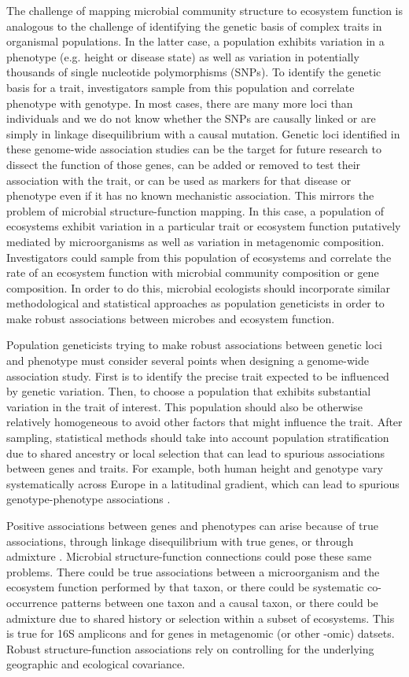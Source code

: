 \documentclass{article}
\begin{document}
The challenge of mapping microbial community structure to ecosystem function is
analogous to the challenge of identifying the genetic basis of complex traits in
organismal populations. In the latter case, a population exhibits variation in a
phenotype (e.g. height or disease state) as well as variation in potentially
thousands of single nucleotide polymorphisms
(SNPs). To identify the genetic basis for a trait, investigators sample from
this population and correlate phenotype with genotype. In most cases, there are
many more loci than individuals and we do not know whether the SNPs are causally
linked or are simply in linkage disequilibrium with a causal mutation. 
Genetic loci identified in these genome-wide association
studies can be the target for future research to dissect the function of those
genes, can be added or removed to test their association with the trait, or can
be used as markers for that disease or phenotype even if it has no known
mechanistic association. This mirrors the problem of microbial
structure-function mapping. In this case, a population of ecosystems exhibit
variation in a particular trait or ecosystem function putatively mediated by
microorganisms as well as variation in metagenomic composition. Investigators
could sample from this population of ecosystems and correlate the rate of an
ecosystem function with microbial community composition or gene composition. 
In order to do this, microbial ecologists should incorporate similar
methodological and statistical approaches as population geneticists in order to
make robust associations between microbes and ecosystem function.

Population geneticists trying to make robust associations between genetic loci
and phenotype must consider several points when designing a genome-wide
association study. First is
to identify the precise trait expected to be influenced by genetic variation. 
Then, to choose a population that exhibits
substantial variation in the trait of interest. This population should also be
otherwise relatively homogeneous to avoid other factors that might influence the
trait. After sampling, statistical methods should take into account population
stratification due to shared ancestry or local selection that can lead to spurious
associations between genes and traits. For example, both human height and
genotype vary systematically across Europe in a latitudinal gradient, which can
lead to spurious genotype-phenotype associations \citep{novembre2008}. 

Positive associations between genes and
phenotypes can arise because of true associations, through linkage
disequilibrium with true genes, or through admixture \citep{lander1994}.
Microbial structure-function connections could pose these same problems. There
could be true associations between a microorganism and the ecosystem function
performed by that taxon, or there could be systematic
co-occurrence patterns between one taxon and a causal taxon,
or there could be admixture due to shared history or selection within
a subset of ecosystems. This is true for 16S amplicons and for
genes in metagenomic (or other -omic) datsets. 
Robust structure-function associations rely on
controlling for the underlying geographic and ecological covariance.
\end{document}
